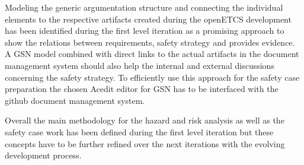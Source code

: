 \documentclass{template/openetcs_report}
\begin{document}
Modeling the generic argumentation structure and connecting the individual elements to the respective artifacts created during the openETCS development has been identified during the first level iteration as a promising approach to show the relations between requirements, safety strategy and provides evidence. A GSN model combined with direct links to the actual artifacts in the document management system should also help the internal and external discussions concerning the safety strategy. To efficiently use this approach for the safety case preparation the  chosen Acedit editor for GSN has to be interfaced with the github document management system. 

Overall the main methodology for the hazard and risk analysis as well as the safety case work has been defined during the first level iteration but these concepts have to be further refined over the next iterations with the evolving development process.





\end{document}
